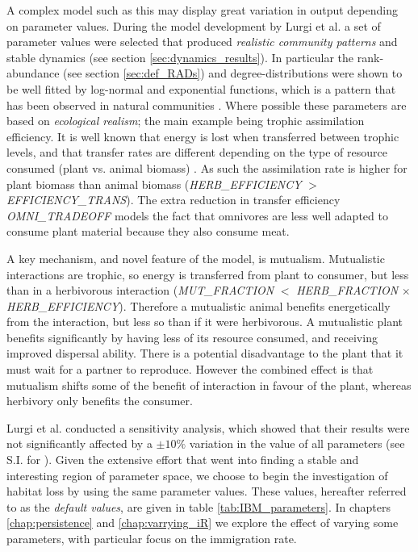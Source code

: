 A complex model such as this may display great variation in output depending on parameter values. During the model development by Lurgi et al. \cite{lurgi2015} a set of parameter values were selected that produced \emph{realistic community patterns} and stable dynamics (see section \ref{sec:dynamics_results}). In particular the rank-abundance (see section \ref{sec:def_RADs}) and degree-distributions were shown to be well fitted by log-normal and exponential functions, which is a pattern that has been observed in natural communities \cite{montoya2006ecological}. Where possible these parameters are based on \emph{ecological realism}; the main example being trophic assimilation efficiency. It is well known that energy is lost when transferred between trophic levels, and that transfer rates are different depending on the type of resource consumed (plant vs. animal biomass) \cite{ings2009review}. As such the assimilation rate is higher for plant biomass than animal biomass (\emph{HERB\_EFFICIENCY} $>$ \emph{EFFICIENCY\_TRANS}). The extra reduction in transfer efficiency \emph{OMNI\_TRADEOFF} models the fact that omnivores are less well adapted to consume plant material because they also consume meat. 

A key mechanism, and novel feature of the model, is mutualism. Mutualistic interactions are trophic, so energy is transferred from plant to consumer, but less than in a herbivorous interaction (\emph{MUT\_FRACTION} $<$ \emph{HERB\_FRACTION} $\times$ \emph{HERB\_EFFICIENCY}). Therefore a mutualistic animal benefits energetically from the interaction, but less so than if it were herbivorous. A mutualistic plant benefits significantly by having less of its resource consumed, and receiving improved dispersal ability. There is a potential disadvantage to the plant that it must wait for a partner to reproduce. However the combined effect is that mutualism shifts some of the benefit of interaction in favour of the plant, whereas herbivory only benefits the consumer.  

Lurgi et al. conducted a sensitivity analysis, which showed that their results were not significantly affected by a $\pm 10\%$ variation in the value of all parameters (see S.I. for \cite{lurgi2015effects}). Given the extensive effort that went into finding a stable and interesting region of parameter space, we choose to begin the investigation of habitat loss by using the same parameter values. These values, hereafter referred to as the \emph{default values}, are given in table \ref{tab:IBM_parameters}. In chapters \ref{chap:persistence} and \ref{chap:varrying_iR} we explore the effect of varying some parameters, with particular focus on the immigration rate.

